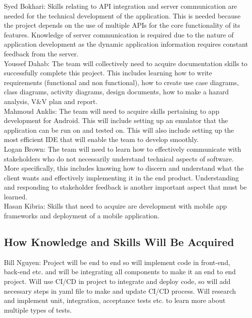 \documentclass[12pt,letterpaper]{article}
\begin{document}
\noindent Syed Bokhari: Skills relating to API integration and server communication are needed for the technical development of the application. This is needed because the project depends on the use of multiple APIs for the core functionality of its features. Knowledge of server communication is required due to the nature of application development as the dynamic application information requires constant feedback from the server. \\

\noindent Youssef Dahab: The team will collectively need to acquire documentation skills to successfully complete this project. This includes learning how to write requirements (functional and non functional), how to create use case diagrams, class diagrams, activity diagrams, design documents, how to make a hazard analysis, V\&V plan and report.\\

\noindent Mahmoud Anklis: The team will need to acquire skills pertaining to app development for Android. This will include setting up an emulator that the application can be run on and tested on. This will also include setting up the most efficient IDE that will enable the team to develop smoothly.\\ 

\noindent Logan Brown: The team will need to learn how to effectively communicate with stakeholders who do not necessarily understand technical aspects of software. More specifically, this includes knowing how to discern and understand what the client wants and effectively implementing it in the end product. Understanding and responding to stakeholder feedback is another important aspect that must be learned.\\

\noindent Hasan Kibria: Skills that need to acquire are development with mobile app frameworks and deployment of a mobile application.\\

\subsection{How Knowledge and Skills Will Be Acquired}

\noindent Bill Nguyen: Project will be end to end so will implement code in front-end, back-end etc. and will be integrating all components to make it an end to end project. Will use CI/CD in project to integrate and deploy code, so will add necessary steps in yaml file to make and update CI/CD process. Will research and implement unit, integration, acceptance tests etc. to learn more about multiple types of tests. \\
\end{document}
